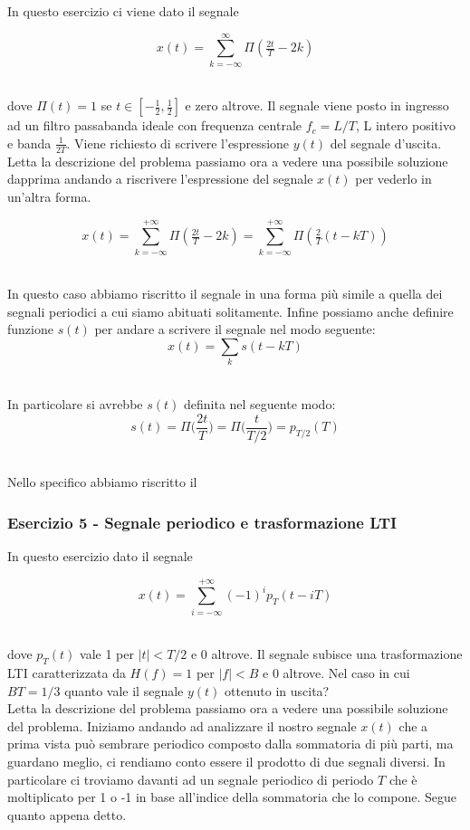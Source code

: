 \documentclass[../main.tex]{subfiles}
\begin{document}
In questo esercizio ci viene dato il segnale

\[x(t) = \sum_{k = -\infty}^\infty  \Pi(\tfrac{2t}{T} - 2k) \]\

dove $\Pi(t) = 1$ se $t \in [-\tfrac{1}{2}, \tfrac{1}{2}] $ e zero altrove. Il segnale viene posto in ingresso ad un filtro passabanda  ideale con frequenza centrale $f_c = L/T$, L intero positivo e banda $\frac{1}{2T}$. Viene richiesto di scrivere l'espressione $y(t)$ del segnale d'uscita.\\

Letta la descrizione del problema passiamo ora a vedere una possibile soluzione dapprima andando a riscrivere l'espressione del segnale $x(t)$ per vederlo in un'altra forma.

\[x(t) = \sum_{k = -\infty}^{+\infty} \Pi(\tfrac{2t}{T} - 2k) = \sum_{k = -\infty}^{+\infty} \Pi(\tfrac{2}{T} (t - kT) ) \]\

In questo caso abbiamo riscritto il segnale in una forma più simile a quella dei segnali periodici a cui siamo abituati solitamente.
Infine possiamo anche definire funzione $s(t)$ per andare a scrivere il segnale nel modo seguente:\\

\[x(t) = \sum_{k} s(t - kT) \]\

In particolare si avrebbe $s(t)$ definita nel seguente modo:\\

\[s(t) = \Pi\bigg(\frac{2t}{T}\bigg) =  \Pi\bigg(  \frac{t}{T/2}\bigg) = p_{T/2}(T) \]\

Nello specifico abbiamo riscritto il 





\subsubsection{Esercizio 5 - Segnale periodico e trasformazione LTI}

In questo esercizio dato il segnale

\[x(t) = \sum_{i = -\infty}^{+\infty} (-1)^i p_T(t - iT) \]\

dove $p_T(t)$ vale 1 per $|t| < T/2$ e 0 altrove. Il segnale subisce una trasformazione LTI caratterizzata da $H(f) = 1 $ per $|f| < B $ e 0 altrove. Nel caso in cui $BT = 1/3 $ quanto vale il segnale $y(t)$ ottenuto in uscita?\\

Letta la descrizione del problema passiamo ora a vedere una possibile soluzione del problema. 
Iniziamo andando ad analizzare il nostro segnale $x(t)$ che a prima vista può sembrare periodico composto dalla sommatoria di più parti, ma guardano meglio, ci rendiamo conto essere il prodotto di due segnali diversi. In particolare ci troviamo davanti ad un segnale periodico di periodo $T$ che è moltiplicato per 1 o -1 in base all'indice della sommatoria che lo compone. Segue quanto appena detto.
\end{document}
